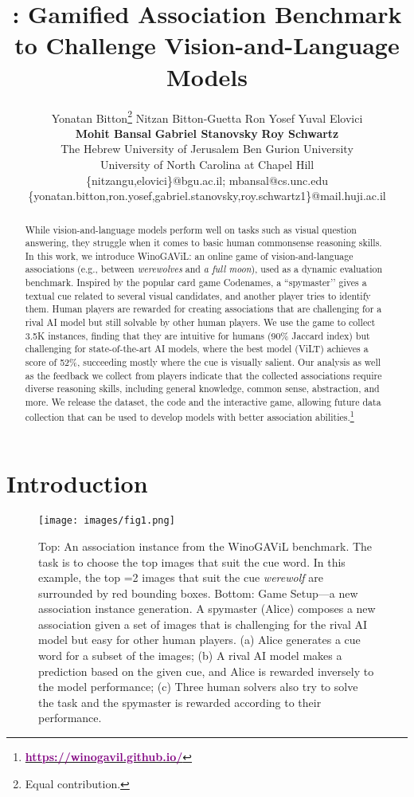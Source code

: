 \documentclass{article}
\title{\ouracronym{}:
Gamified Association Benchmark \\ to Challenge Vision-and-Language Models}
\author{
  Yonatan Bitton\thanks{Equal contribution.} \;\; 
 Nitzan Bitton-Guetta\footnotemark[1] \;\; 
 Ron Yosef  \;\; 
 Yuval Elovici \;\; 
 \\ 
  \textbf{Mohit Bansal} \;\;
 \textbf{Gabriel Stanovsky} \;\;
 \textbf{Roy Schwartz}\\
 The Hebrew University of Jerusalem \quad
 Ben Gurion University \\
  University of North Carolina at Chapel Hill \\
  \{nitzangu,elovici\}@bgu.ac.il; mbansal@cs.unc.edu \\
    \{yonatan.bitton,ron.yosef,gabriel.stanovsky,roy.schwartz1\}@mail.huji.ac.il \\
}
\newcommand{\ouracronym}[0]{WinoGAViL}
\begin{document}
\maketitle


\setcounter{footnote}{0} 
\begin{abstract}
  While vision-and-language models perform well on tasks such as visual question answering, they struggle when it comes to basic human commonsense reasoning skills. In this work, we introduce WinoGAViL: an online game of vision-and-language associations (e.g., between \emph{werewolves} and \emph{a full moon}), used as a dynamic evaluation benchmark. Inspired by the popular card game Codenames, a ``spymaster’' gives a textual cue related to several visual candidates, and another player tries to identify them. Human players are rewarded for creating associations that are challenging for a rival AI model but still solvable by other human players. We use the game to collect 3.5K instances, finding that they are intuitive for humans (90\% Jaccard index) but challenging for state-of-the-art AI models, where the best model (ViLT) achieves a score of 52\%, succeeding mostly where the cue is visually salient. Our analysis as well as the feedback we collect from players indicate that the collected associations require diverse reasoning skills, including general knowledge, common sense, abstraction, and more. We release the dataset, the code and the interactive game, allowing future data collection that can be used to develop models with better association abilities.\footnote{\href{https://winogavil.github.io/}{\textbf{\textcolor{purple}{https://winogavil.github.io/}}}} \end{abstract}

\section{Introduction}



\begin{figure}[!tb]
\centering
\newcommand{\figlen}[0]{\columnwidth}
    \texttt{[image: images/fig1.png]}\\
    \caption{Top: An association instance from the \ouracronym{} benchmark. The task is to choose the top  images that suit the cue word. In this example, the top =2 images that suit the cue \textit{werewolf} are surrounded by red bounding boxes. Bottom: Game Setup---a new association instance generation. A spymaster (Alice) composes a new association given a set of images that is challenging for the rival AI model but easy for other human players. (a) Alice generates a cue word for a subset of the images; (b) A rival AI model makes a prediction based on the given cue, and Alice is rewarded inversely to the model performance; (c) Three human solvers also try to solve the task and the spymaster is rewarded according to their performance.
    }
    \label{fig:fig1}
\end{figure}
 
\end{document}

